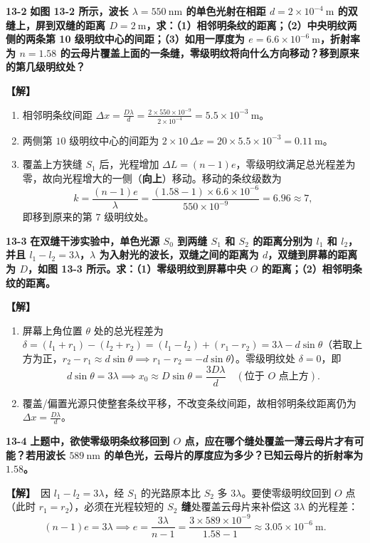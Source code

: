 \documentclass[zihao=5,a4paper,UTF8]{ctexart}
\newenvironment{prob}[2]{%
    \par\vspace{6pt}\noindent\textbf{\color{navy}#1} \textbf{#2}\par\nopagebreak\vspace{2pt}%
}{%
    \par\vspace{4pt}%
}
\newcommand{\sol}{\noindent\textbf{\color{tealaccent}【解】}\ }
\begin{document}
\begin{prob}{13-2}{如图 13-2 所示，波长 $\lambda=550\ \mathrm{nm}$ 的单色光射在相距 $d=2\times 10^{-4}\ \mathrm{m}$ 的双缝上，屏到双缝的距离 $D=2\ \mathrm{m}$，求：（1）相邻明条纹的距离；（2）中央明纹两侧的两条第 10 级明纹中心的间距；（3）如用一厚度为 $e=6.6\times 10^{-6}\ \mathrm{m}$，折射率为 $n=1.58$ 的云母片覆盖上面的一条缝，零级明纹将向什么方向移动？移到原来的第几级明纹处？}
\sol
\begin{enumerate}[leftmargin=2em, itemsep=2pt]
    \item 相邻明条纹间距 $\Delta x = \frac{D\lambda}{d} = \frac{2\times 550\times 10^{-9}}{2\times 10^{-4}} = 5.5\times 10^{-3}\ \mathrm{m}$。
    \item 两侧第 $10$ 级明纹中心的间距为 $2\times 10\,\Delta x = 20\times 5.5\times 10^{-3} = 0.11\ \mathrm{m}$。
    \item 覆盖上方狭缝 $S_1$ 后，光程增加 $\Delta L = (n-1)e$，零级明纹满足总光程差为零，故向光程增大的一侧（\textbf{向上}）移动。移动的条纹级数为
    \[
        k = \frac{(n-1)e}{\lambda} = \frac{(1.58 - 1)\times 6.6\times 10^{-6}}{550\times 10^{-9}} = 6.96 \approx 7,
    \]
    即移到原来的第 $7$ 级明纹处。
\end{enumerate}
\end{prob}

\begin{prob}{13-3}{在双缝干涉实验中，单色光源 $S_0$ 到两缝 $S_1$ 和 $S_2$ 的距离分别为 $l_1$ 和 $l_2$，并且 $l_1 - l_2 = 3\lambda$，$\lambda$ 为入射光的波长，双缝之间的距离为 $d$，双缝到屏幕的距离为 $D$，如图 13-3 所示。求：（1）零级明纹到屏幕中央 $O$ 的距离；（2）相邻明条纹的距离。}
\sol
\begin{enumerate}[leftmargin=2em, itemsep=2pt]
    \item 屏幕上角位置 $\theta$ 处的总光程差为 $\delta = (l_1 + r_1) - (l_2 + r_2) = (l_1 - l_2) + (r_1 - r_2) = 3\lambda - d\sin\theta$（若取上方为正，$r_2 - r_1 \approx d\sin\theta \implies r_1 - r_2 = -d\sin\theta$）。零级明纹处 $\delta = 0$，即
    \[
        d\sin\theta = 3\lambda \implies x_0 \approx D\sin\theta = \frac{3D\lambda}{d}\quad (\text{位于 } O \text{ 点上方}).
    \]
    \item 覆盖/偏置光源只使整套条纹平移，不改变条纹间距，故相邻明条纹距离仍为 $\Delta x = \frac{D\lambda}{d}$。
\end{enumerate}
\end{prob}

\begin{prob}{13-4}{上题中，欲使零级明条纹移回到 $O$ 点，应在哪个缝处覆盖一薄云母片才有可能？若用波长 $589\ \mathrm{nm}$ 的单色光，云母片的厚度应为多少？已知云母片的折射率为 $1.58$。}
\sol 因 $l_1 - l_2 = 3\lambda$，经 $S_1$ 的光路原本比 $S_2$ 多 $3\lambda$。要使零级明纹回到 $O$ 点（此时 $r_1 = r_2$），必须在光程较短的 \textbf{$S_2$ 缝}处覆盖云母片来补偿这 $3\lambda$ 的光程差：
\[
    (n - 1)e = 3\lambda \implies e = \frac{3\lambda}{n - 1} = \frac{3\times 589\times 10^{-9}}{1.58 - 1} \approx 3.05\times 10^{-6}\ \mathrm{m}.
\]
\end{prob}
\end{document}
